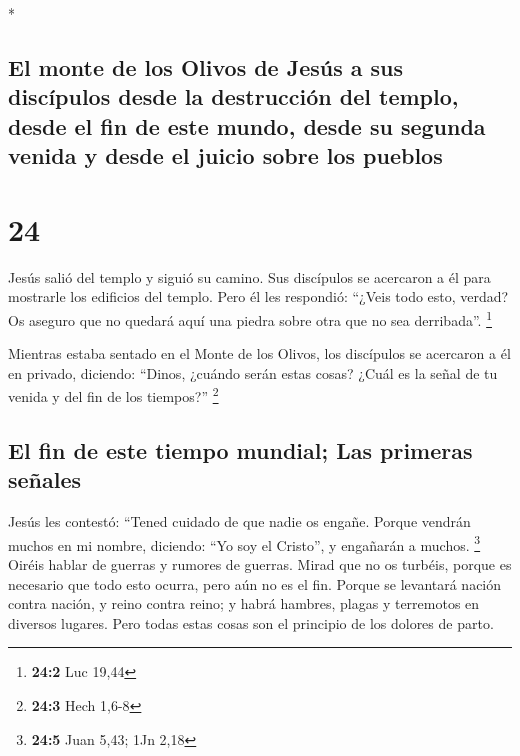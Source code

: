 \begin{paracol}{2}
\begin{otherlanguage}{english}
\end{otherlanguage}

\switchcolumn[0]*

\hypertarget{el-monte-de-los-olivos-de-jesuxfas-a-sus-discuxedpulos-desde-la-destrucciuxf3n-del-templo-desde-el-fin-de-este-mundo-desde-su-segunda-venida-y-desde-el-juicio-sobre-los-pueblos}{%
\subsection{El monte de los Olivos de Jesús a sus discípulos desde la
destrucción del templo, desde el fin de este mundo, desde su segunda
venida y desde el juicio sobre los
pueblos}\label{el-monte-de-los-olivos-de-jesuxfas-a-sus-discuxedpulos-desde-la-destrucciuxf3n-del-templo-desde-el-fin-de-este-mundo-desde-su-segunda-venida-y-desde-el-juicio-sobre-los-pueblos}}

\hypertarget{section-46}{%
\section{24}\label{section-46}}

 Jesús salió del templo y siguió su camino. Sus discípulos
se acercaron a él para mostrarle los edificios del templo.
 Pero él les respondió: ``¿Veis todo esto, verdad? Os
aseguro que no quedará aquí una piedra sobre otra que no sea
derribada''. \footnote{\textbf{24:2} Luc 19,44}

 Mientras estaba sentado en el Monte de los Olivos, los
discípulos se acercaron a él en privado, diciendo: ``Dinos, ¿cuándo
serán estas cosas? ¿Cuál es la señal de tu venida y del fin de los
tiempos?'' \footnote{\textbf{24:3} Hech 1,6-8}

\hypertarget{el-fin-de-este-tiempo-mundial-las-primeras-seuxf1ales}{%
\subsection{El fin de este tiempo mundial; Las primeras
señales}\label{el-fin-de-este-tiempo-mundial-las-primeras-seuxf1ales}}

 Jesús les contestó: ``Tened cuidado de que nadie os
engañe.  Porque vendrán muchos en mi nombre, diciendo:
``Yo soy el Cristo'', y engañarán a muchos. \footnote{\textbf{24:5} Juan
  5,43; 1Jn 2,18}  Oiréis hablar de guerras y rumores de
guerras. Mirad que no os turbéis, porque es necesario que todo esto
ocurra, pero aún no es el fin.  Porque se levantará nación
contra nación, y reino contra reino; y habrá hambres, plagas y
terremotos en diversos lugares.  Pero todas estas cosas
son el principio de los dolores de parto.


\end{paracol}
